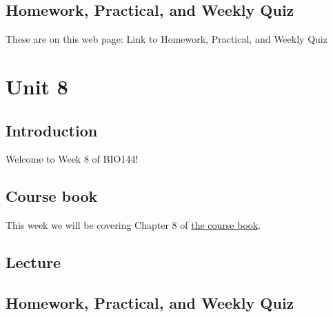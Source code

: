 \documentclass[
  letterpaper,
  8pt,
  a4paper]{book}
\begin{document}

\section*{Homework, Practical, and Weekly
Quiz}\label{homework-practical-and-weekly-quiz-6}


These are on this web page: Link to Homework, Practical, and Weekly Quiz


\chapter*{Unit 8}\label{unit-8}


\section*{Introduction}\label{introduction-8}


Welcome to Week 8 of BIO144!

\section*{Course book}\label{course-book-7}


This week we will be covering Chapter 8 of
\href{https://opetchey.github.io/BIO144_Course_Book/}{the course book}.

\section*{Lecture}\label{lecture-7}


\section*{Homework, Practical, and Weekly
Quiz}\label{homework-practical-and-weekly-quiz-7}
\end{document}
